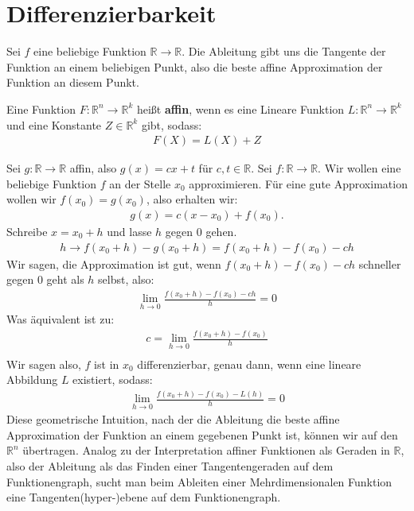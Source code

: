 \documentclass{report}
\newcommand*{\newpar}{\par\vspace{\baselineskip}\noindent}
\newcommand{\tbf}[1]{\textbf{#1}}
\newcommand{\bR}{\mathbb{R}}
\begin{document}
\section{Differenzierbarkeit}
Sei $f$ eine beliebige Funktion $\bR \to \bR$. Die Ableitung gibt uns die Tangente der Funktion an einem beliebigen Punkt, also die beste affine Approximation der Funktion an diesem Punkt.
\begin{definition}
 Eine Funktion $F : \bR^n \to \bR^k$ heißt \tbf{affin}, wenn es eine Lineare Funktion $L : \bR^n \to \bR^k$ und eine Konstante $Z \in \bR^k$ gibt, sodass:
 \begin{align*}
  F(X) = L(X) + Z
 \end{align*}
\end{definition}
\newpar
Sei $g : \bR \to \bR$ affin, also $g(x) = cx + t$ für $c,t \in \bR$. Sei $f : \bR \to \bR$. Wir wollen eine beliebige Funktion $f$ an der Stelle $x_0$ approximieren. Für eine gute Approximation wollen wir $f(x_0) = g(x_0)$, also erhalten wir:
\begin{align*}
 g(x) = c(x - x_0) + f(x_0).
\end{align*}
Schreibe $x = x_0 + h$ und lasse $h$ gegen $0$ gehen.
\begin{align*}
 h \to f(x_0 + h) - g(x_0 + h) = f(x_0 + h) - f(x_0) - ch
\end{align*}
Wir sagen, die Approximation ist gut, wenn $f(x_0 + h) - f(x_0) - ch$ schneller gegen $0$ geht als $h$ selbst, also:
\begin{align}
\label{eq:goodapprox}
 \lim_{h \to 0} \frac{f(x_0 + h) - f(x_0) - ch}{h} = 0
\end{align}
Was äquivalent ist zu:
\begin{align*}
 c = \lim_{h \to 0} \frac{f(x_0 + h) - f(x_0)}{h}\\
\end{align*}
Wir sagen also, $f$ ist in $x_0$ differenzierbar, genau dann, wenn eine lineare Abbildung $L$ existiert, sodass:
\begin{align*}
 \lim_{h \to 0} \frac{f(x_0 + h) - f(x_0) - L(h)}{h} = 0
\end{align*}
Diese geometrische Intuition, nach der die Ableitung die beste affine Approximation der Funktion an einem gegebenen Punkt ist, können wir auf den $\bR^n$ übertragen. Analog zu der Interpretation affiner Funktionen als Geraden in $\bR$, also der Ableitung als das Finden einer Tangentengeraden auf dem Funktionengraph, sucht man beim Ableiten einer Mehrdimensionalen Funktion eine Tangenten(hyper-)ebene auf dem Funktionengraph.
\end{document}
